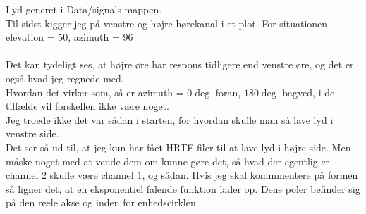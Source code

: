 \begin{Øvelser}
\begin{kapitel}
        \begin{Øvelse}
            Lyd generet i Data/signals mappen.\\
            Til sidst kigger jeg på venstre og højre hørekanal i et plot. For situationen elevation = 50, azimuth = 96
            \\\\
            Det kan tydeligt ses, at højre øre har respons tidligere end venstre øre, og det er også hvad jeg regnede med. \\
            Hvordan det virker som, så er azimuth = $0\deg$ foran, $180\deg$ bagved, i de tilfælde vil forskellen ikke være noget. \\
            Jeg troede ikke det var sådan i starten, for hvordan skulle man så lave lyd i venstre side.\\
            Det ser så ud til, at jeg kun har fået HRTF filer til at lave lyd i højre side.
            Men måske noget med at vende dem om kunne gøre det, så hvad der egentlig er channel 2 skulle være channel 1, og sådan.\clearpage
            Hvis jeg skal kommmentere på formen så ligner det, at en eksponentiel falende funktion lader op. 
            Dens poler befinder sig på den reele akse og inden for enhedscirklen
        \end{Øvelse}
    \end{kapitel}
\end{Øvelser}
